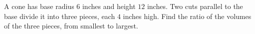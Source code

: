 A cone has base radius $6$ inches and height $12$ inches. Two cuts parallel to the base divide it into three pieces, each $4$ inches high. Find the ratio of the volumes of the three pieces, from smallest to largest.
